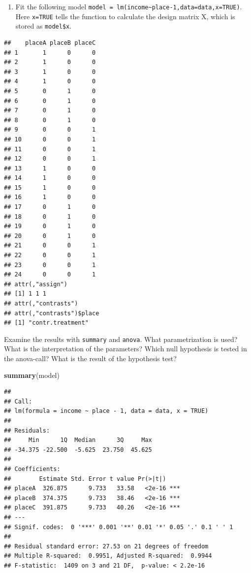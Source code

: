 \documentclass[
]{article}
\newenvironment{Shaded}{\begin{snugshade}}{\end{snugshade}}
\newcommand{\AttributeTok}[1]{\textcolor[rgb]{0.13,0.29,0.53}{#1}}
\newcommand{\ConstantTok}[1]{\textcolor[rgb]{0.56,0.35,0.01}{#1}}
\newcommand{\DecValTok}[1]{\textcolor[rgb]{0.00,0.00,0.81}{#1}}
\newcommand{\FunctionTok}[1]{\textcolor[rgb]{0.13,0.29,0.53}{\textbf{#1}}}
\newcommand{\NormalTok}[1]{#1}
\newcommand{\OtherTok}[1]{\textcolor[rgb]{0.56,0.35,0.01}{#1}}
\newcommand{\SpecialCharTok}[1]{\textcolor[rgb]{0.81,0.36,0.00}{\textbf{#1}}}
\providecommand{\tightlist}{%
  \setlength{\itemsep}{0pt}\setlength{\parskip}{0pt}}
\begin{document}
\begin{enumerate}
\def\labelenumi{\arabic{enumi}.}
\setcounter{enumi}{1}
\tightlist
\item
  Fit the following model
  \texttt{model\ =\ lm(income\textasciitilde{}place-1,data=data,x=TRUE)}.
  Here \texttt{x=TRUE} tells the function to calculate the design matrix
  X, which is stored as \texttt{model\$x}.
\end{enumerate}

\begin{Shaded}
\end{Shaded}

\begin{verbatim}
##    placeA placeB placeC
## 1       1      0      0
## 2       1      0      0
## 3       1      0      0
## 4       1      0      0
## 5       0      1      0
## 6       0      1      0
## 7       0      1      0
## 8       0      1      0
## 9       0      0      1
## 10      0      0      1
## 11      0      0      1
## 12      0      0      1
## 13      1      0      0
## 14      1      0      0
## 15      1      0      0
## 16      1      0      0
## 17      0      1      0
## 18      0      1      0
## 19      0      1      0
## 20      0      1      0
## 21      0      0      1
## 22      0      0      1
## 23      0      0      1
## 24      0      0      1
## attr(,"assign")
## [1] 1 1 1
## attr(,"contrasts")
## attr(,"contrasts")$place
## [1] "contr.treatment"
\end{verbatim}

Examine the results with \texttt{summary} and \texttt{anova}. What
parametrization is used? What is the interpretation of the parameters?
Which null hypothesis is tested in the anova-call? What is the result of
the hypothesis test?

\begin{Shaded}
\begin{Highlighting}[]
\FunctionTok{summary}\NormalTok{(model)}
\end{Highlighting}
\end{Shaded}

\begin{verbatim}
## 
## Call:
## lm(formula = income ~ place - 1, data = data, x = TRUE)
## 
## Residuals:
##     Min      1Q  Median      3Q     Max 
## -34.375 -22.500  -5.625  23.750  45.625 
## 
## Coefficients:
##        Estimate Std. Error t value Pr(>|t|)    
## placeA  326.875      9.733   33.58   <2e-16 ***
## placeB  374.375      9.733   38.46   <2e-16 ***
## placeC  391.875      9.733   40.26   <2e-16 ***
## ---
## Signif. codes:  0 '***' 0.001 '**' 0.01 '*' 0.05 '.' 0.1 ' ' 1
## 
## Residual standard error: 27.53 on 21 degrees of freedom
## Multiple R-squared:  0.9951, Adjusted R-squared:  0.9944 
## F-statistic:  1409 on 3 and 21 DF,  p-value: < 2.2e-16
\end{verbatim}
\end{document}

